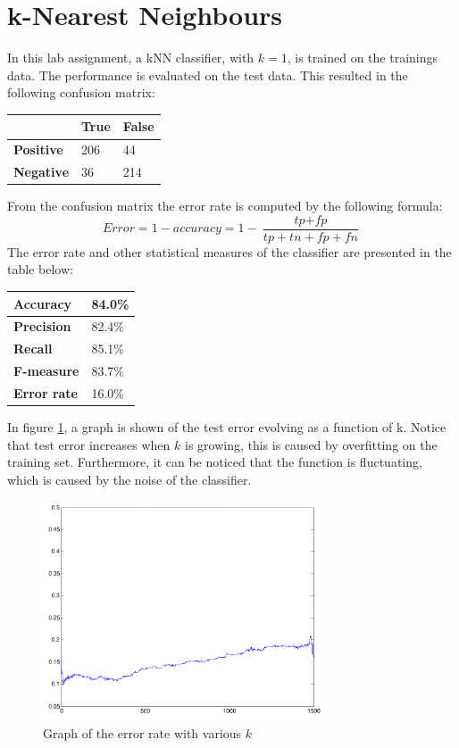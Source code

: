 \documentclass[a4paper]{article}
\begin{document}
\section{k-Nearest Neighbours}
In this lab assignment, a kNN classifier, with $k = 1$, is trained on the trainings data. The performance is evaluated on the test data. This resulted in the following confusion matrix:
\begin{center}
\begin{tabular}{ | l | l | l | }
\hline
 & \textbf{True} & \textbf{False}\\
\hline
\textbf{Positive} & 206 & 44\\
\hline
\textbf{Negative} & 36 & 214\\
\hline
\end{tabular}
\end{center}
From the confusion matrix the error rate is computed by the following formula:
\begin{equation}
\textit{Error} = 1 - \textit{accuracy} = 1 - \frac{\textit{tp} + \textit{fp}}{\textit{tp} + \textit{tn} + \textit{fp} + \textit{fn}}
\end{equation}
The error rate and other statistical measures of the classifier are presented in the table below:
\begin{center}
\begin{tabular}{ | l | l | }
\hline
\textbf{Accuracy} & 84.0\%\\
\hline
\textbf{Precision} & 82.4\%\\
\hline
\textbf{Recall} & 85.1\%\\
\hline
\textbf{F-measure} & 83.7\%\\
\hline
\textbf{Error rate} & 16.0\%\\
\hline
\end{tabular}
\end{center}
In figure \ref{error_rate}, a graph is shown of the test error evolving as a function of k. Notice that test error increases when $k$ is growing, this is caused by overfitting on the training set. Furthermore, it can be noticed that the function is fluctuating, which is caused by the noise of the classifier.
\begin{figure}[!ht]
\centering
\includegraphics[width=0.75\textwidth]{images/error_rate_1500_1.pdf}
\caption{Graph of the error rate with various $k$}
\label{error_rate}
\end{figure}\\
\end{document}
